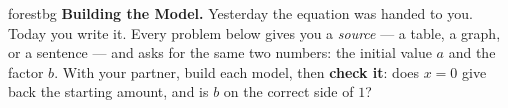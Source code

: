 \documentclass[10pt]{article}
\begin{document}
\namepartnerperiod

\vspace{0.08in}

\begin{headlinebox}{forestbg}
\small\textbf{Building the Model.} Yesterday the equation was handed to you. Today you write it. Every
problem below gives you a \emph{source} --- a table, a graph, or a sentence --- and asks for the same
two numbers: the initial value $a$ and the factor $b$. With your partner, build each model, then
\textbf{check it}: does $x=0$ give back the starting amount, and is $b$ on the correct side of $1$?
\end{headlinebox}

\vspace{0.06in}
\end{document}
